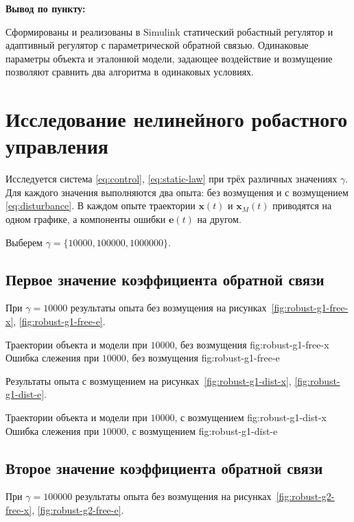 \noindent\textbf{Вывод по пункту:}

Сформированы и реализованы в Simulink статический робастный регулятор
и адаптивный регулятор с параметрической обратной связью.
Одинаковые параметры объекта и эталонной модели, задающее воздействие
и возмущение позволяют сравнить два алгоритма в одинаковых условиях.


\section{Исследование нелинейного робастного управления}

Исследуется система
\eqref{eq:control}, \eqref{eq:static-law} при трёх различных значениях
$\gamma$. Для каждого значения выполняются два опыта: без возмущения
и с возмущением \eqref{eq:disturbance}. В каждом опыте траектории
$\bm x(t)$ и $\bm x_M(t)$ приводятся на одном графике, а компоненты
ошибки $\bm e(t)$ \textemdash{} на другом.

Выберем $\gamma=\{10000, 100000, 1000000\}$.

\subsection{Первое значение коэффициента обратной связи}

При $\gamma=10000$ результаты опыта без возмущения
на рисунках~\ref{fig:robust-g1-free-x}, \ref{fig:robust-g1-free-e}.

  {Траектории объекта и модели при $10000$, без возмущения}
  {fig:robust-g1-free-x}
  {Ошибка слежения при $10000$, без возмущения}
  {fig:robust-g1-free-e}

Результаты опыта с возмущением
на рисунках~\ref{fig:robust-g1-dist-x}, \ref{fig:robust-g1-dist-e}.

  {Траектории объекта и модели при $10000$, с возмущением}
  {fig:robust-g1-dist-x}
  {Ошибка слежения при $10000$, с возмущением}
  {fig:robust-g1-dist-e}

\subsection{Второе значение коэффициента обратной связи}

При $\gamma=100000$ результаты опыта без возмущения
на рисунках~\ref{fig:robust-g2-free-x}, \ref{fig:robust-g2-free-e}.

